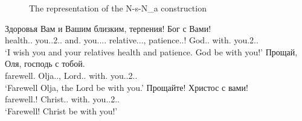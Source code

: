 \documentclass[output=paper]{langscibook}
\begin{document}
\begin{sidewaysfigure}
\setlength{\fboxrule}{1pt}
\caption{\label{fig:mikhailov:2}The representation of the N-s-N\_a construction}
\end{sidewaysfigure}


\ea
\ea
\gll Здоровья Вам и Вашим близким, терпения! Бог с Вами!\\
     health.{\NOUN}.{\GEN} you.{\PRON}.2.{\DAT}.{\PL} and.{\CONJ} you.{\PRON}.{\POSS}.{\DAT}.{\PL} relative.{\NOUN}.{\DAT}.{\PL}, patience.{\NOUN}.{\GEN}! God.{\NOUN}.{\NOM} with.{\PREP} you.2.{\INSTR}.{\PL}\\
\glt `I wish you and your relatives health and patience. God be with you!'
\ex
\gll Прощай, Оля, господь с тобой.\\
     farewell.{\ADV} Olja.{\NOUNPROPER}.{\NOM}, Lord.{\NOUN}.{\NOM} with.{\PREP} you.{\PRON}.2.{\INSTR}.{\SG}\\
\glt `Farewell Olja, the Lord be with you.'
\ex
\gll Прощайте! Христос с вами!\\
     farewell.{\ADV}! Christ.{\NOUN}.{\NOM} with.{\PREP} you.{\PRON}.2.{\INSTR}.{\PL}\\
\glt `Farewell! Christ be with you!'
\z
\z
\end{document}
